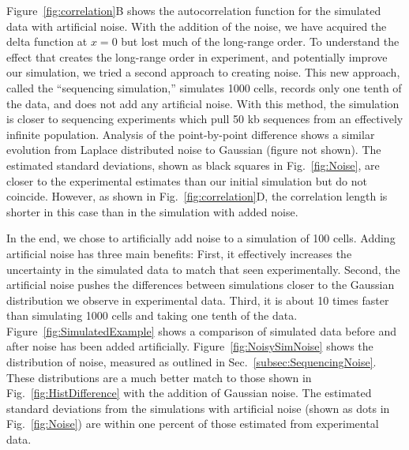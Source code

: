 		Figure~\ref{fig:correlation}B shows the autocorrelation function for the simulated data with artificial noise.
		With the addition of the noise, we have acquired the delta function at $x=0$ but lost much of the long-range order.
		To understand the effect that creates the long-range order in experiment, and potentially improve our simulation, we tried a second approach to creating noise.
		This new approach, called the ``sequencing simulation,'' simulates 1000 cells, records only one tenth of the data, and does not add any artificial noise.
		With this method, the simulation is closer to sequencing experiments which pull 50 kb sequences from an effectively infinite population.
		Analysis of the point-by-point difference shows a similar evolution from Laplace distributed noise to Gaussian (figure not shown).
		The estimated standard deviations, shown as black squares in Fig.~\ref{fig:Noise}, are closer to the experimental estimates than our initial simulation but do not coincide.
		However, as shown in Fig.~\ref{fig:correlation}D, the correlation length is shorter in this case than in the simulation with added noise.
		
		In the end, we chose to artificially add noise to a simulation of 100 cells.
		Adding artificial noise has three main benefits:
		First, it effectively increases the uncertainty in the simulated data to match that seen experimentally.
		Second, the artificial noise pushes the differences between simulations closer to the Gaussian distribution we observe in experimental data.
		Third, it is about 10 times faster than simulating 1000 cells and taking one tenth of the data.
		Figure~\ref{fig:SimulatedExample} shows a comparison of simulated data before and after noise has been added artificially.
		Figure~\ref{fig:NoisySimNoise} shows the distribution of noise, measured as outlined in Sec.~\ref{subsec:SequencingNoise}.
		These distributions are a much better match to those shown in Fig.~\ref{fig:HistDifference} with the addition of Gaussian noise.
		The estimated standard deviations from the simulations with artificial noise (shown as dots in Fig.~\ref{fig:Noise}) are within one percent of those estimated from experimental data.
		
